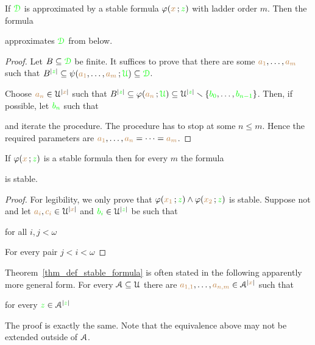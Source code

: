 \documentclass[creche.tex]{subfiles}
\begin{document}
\begin{lemma}
If ${\color{green}\EuScript D}$ is approximated by a stable formula $\varphi({\color{brown} x}\,;{\color{green} z})$ with ladder order $m$. Then the formula 



approximates ${\color{green}\EuScript D}$ from below.
\end{lemma}

\begin{proof}
Let $B\subseteq{\color{green}\EuScript D}$ be finite. It suffices to prove that there are some ${\color{brown} a_1},\dots,{\color{brown} a_m}$ such that $B^{|{\color{green} z}|}\subseteq\psi({\color{brown} a_1},\dots,{\color{brown} a_m}\,;{\color{green}\EuScript U})\subseteq{\color{green}\EuScript D}$. 

Choose ${\color{brown} a_n}\in\EuScript U^{|{\color{brown} x}|}$ such that $B^{|{\color{green} z}|}\subseteq\varphi({\color{brown} a_n}\,;{\color{green}\EuScript U})\subseteq\EuScript U^{|{\color{green} z}|}\smallsetminus\{{\color{green} b_0},\dots,{\color{green} b_{n-1}}\}$. Then, if possible, let ${\color{green} b_n}$ such that


and iterate the procedure. The procedure has to stop at some $n\le m$. Hence the required parameters are ${\color{brown} a_1},\dots,{\color{brown} a_n}=\dots={\color{brown} a_{m}}$.
\end{proof}



\begin{lemma}
If $\varphi({\color{brown} x}\,;{\color{green} z})$ is a stable formula then for every $m$ the formula 



is stable.
\end{lemma}

\begin{proof}
For legibility, we only prove that $\varphi({\color{brown} x_1}\,;{\color{green} z})\wedge\varphi({\color{brown} x_2}\,;{\color{green} z})$ is stable. Suppose not and let ${\color{brown} a_i},{\color{brown} c_i}\in\EuScript U^{|{\color{brown} x}|}$ and ${\color{green} b_i}\in\EuScript U^{|{\color{green} z}|}$ be such that 


\hfill for all $i,j<\omega$


For every pair $j<i<\omega$
\end{proof}


\begin{remark}
Theorem~\ref{thm_def_stable_formula} is often stated in the following  apparently more general form. For every $\EuScript A\subseteq\EuScript U$ there are ${\color{brown} a_{1,1}},\dots,{\color{brown} a_{n,m}}\in \EuScript A^{|{\color{brown} x}|}$ such that

\hfill for every ${\color{green} z}\in\EuScript A^{|{\color{green} z}|}$

The proof is exactly the same. Note that the equivalence above may not be extended outside of $\EuScript A$.\QED 
\end{remark}
\end{document}
